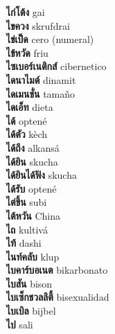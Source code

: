 \textbf{ ไก่โต้ง  } gai \\
\textbf{ ไขควง  } skrufdrai \\
\textbf{ ไข่เป็ด  } cero (numeral) \\
\textbf{ ไข้หวัด  } friu \\
\textbf{ ไซเบอร์เนติกส์  } cibernetico \\
\textbf{ ไดนาไมต์  } dinamit \\
\textbf{ ไดเมนชั่น  } tamaño \\
\textbf{ ไดเอ็ท  } dieta \\
\textbf{ ได้  } optené \\
\textbf{ ได้ตัว  } kèch \\
\textbf{ ได้ถึง  } alkansá \\
\textbf{ ได้ยิน  } skucha \\
\textbf{ ได้ยินได้ฟัง  } skucha \\
\textbf{ ได้รับ  } optené \\
\textbf{ ไต่ขึ้น  } subi \\
\textbf{ ไต้หวัน  } China \\
\textbf{ ไถ  } kultivá \\
\textbf{ ไท้  } dashi \\
\textbf{ ไนท์คลับ  } klup \\
\textbf{ ไบคาร์บอเนต  } bikarbonato \\
\textbf{ ไบสัน  } bison \\
\textbf{ ไบเซ็กชวลลิตี้  } bisexualidad \\
\textbf{ ไบเบิล  } bijbel \\
\textbf{ ไป  } sali \\

